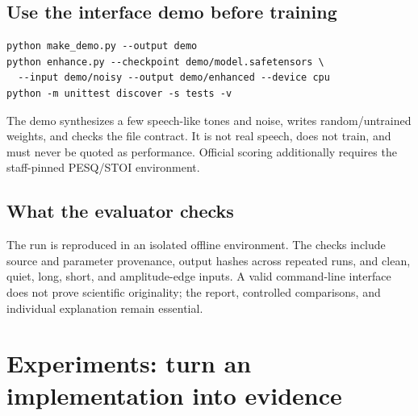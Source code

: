\documentclass[11pt,letterpaper]{article}
\newcommand{\page}[1]{\clearpage\section{#1}}
\begin{document}
\subsection{Use the interface demo before training}
\begin{lstlisting}
python make_demo.py --output demo
python enhance.py --checkpoint demo/model.safetensors \
  --input demo/noisy --output demo/enhanced --device cpu
python -m unittest discover -s tests -v
\end{lstlisting}
The demo synthesizes a few speech-like tones and noise, writes random/untrained weights, and checks the file contract. It is not real speech, does not train, and must never be quoted as performance. Official scoring additionally requires the staff-pinned PESQ/STOI environment.

\subsection{What the evaluator checks}
The run is reproduced in an isolated offline environment. The checks include source and parameter provenance, output hashes across repeated runs, and clean, quiet, long, short, and amplitude-edge inputs. A valid command-line interface does not prove scientific originality; the report, controlled comparisons, and individual explanation remain essential.

\page{Experiments: turn an implementation into evidence}
\end{document}
